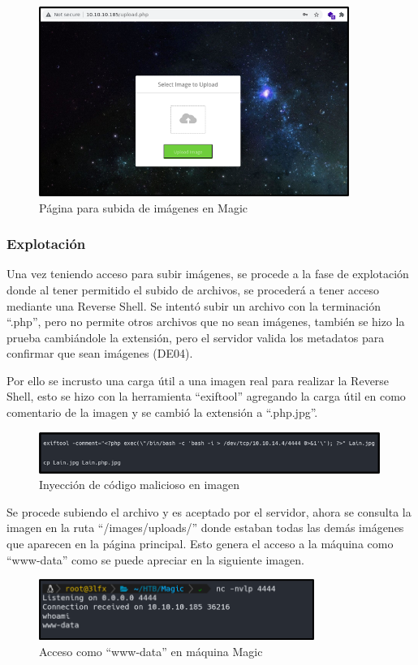 \begin{figure}[H]
    \centering
    \includegraphics[width=0.9\textwidth]{imagenes/submag.png}
    \caption{Página para subida de imágenes en Magic}
\end{figure}
\subsubsection{Explotación}
Una vez teniendo acceso para subir imágenes, se procede a la fase de explotación donde al tener permitido el subido de archivos, se procederá a tener acceso mediante una Reverse Shell. Se intentó subir un archivo con la terminación “.php”, pero no permite otros archivos que no sean imágenes, también se hizo la prueba cambiándole la extensión, pero el servidor valida los metadatos para confirmar que sean imágenes (DE04).

Por ello se incrusto una carga útil a una imagen real para realizar la Reverse Shell, esto se hizo con la herramienta “exiftool” agregando la carga útil en como comentario de la imagen y se cambió la extensión a “.php.jpg”.
\begin{figure}[H]
    \centering
    \includegraphics[width=0.99\textwidth]{imagenes/inyima.png}
    \caption{Inyección de código malicioso en imagen}
\end{figure}
Se procede subiendo el archivo y es aceptado por el servidor, ahora se consulta la imagen en la ruta “/images/uploads/” donde estaban todas las demás imágenes que aparecen en la página principal. Esto genera el acceso a la máquina como “www-data” como se puede apreciar en la siguiente imagen.
\begin{figure}[H]
    \centering
    \includegraphics[width=0.8\textwidth]{imagenes/acwma.png}
    \caption{Acceso como ``www-data” en máquina Magic}
\end{figure}
